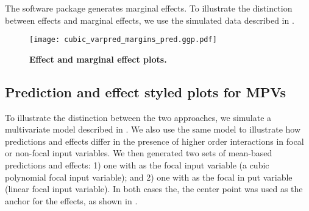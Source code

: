 The  software package  \cite{lenth2018package} generates marginal effects. To illustrate the distinction between effects and marginal effects, we use the simulated data described in . 
%
\begin{figure}
\centering
\texttt{[image: cubic\_varpred\_margins\_pred.ggp.pdf]}
\caption{{\bf Effect and marginal effect plots.} }
\label{fig:qoi_age_pred_plot}
\end{figure}
%


\subsection{Prediction and effect styled plots for MPVs}

To illustrate the distinction between the two approaches, we simulate a multivariate model described in . We also use the same model to illustrate how predictions and effects differ in the presence of higher order interactions in focal or non-focal input variables. We then generated two sets of mean-based predictions and effects: 1) one with  as the focal input variable (a cubic polynomial focal input variable); and 2) one with  as the focal in put variable (linear focal input variable). In both cases the, the center point was used as the anchor for the effects, as shown in .

